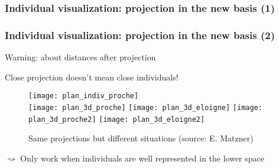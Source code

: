 \begin{frame}[fragile]
  \frametitle{Individual visualization: projection in the new basis (1)}

\begin{knitrout}
\color{fgcolor}\begin{kframe}
\begin{alltt}
  \hlstd{=} \hlopt{$}\hlopt{$}  
\end{alltt}


{\ttfamily\noindent\bfseries{}}\end{kframe}
\end{knitrout}

\end{frame}

\begin{frame}[fragile]
  \frametitle{Individual visualization: projection in the new basis (2)}

\begin{knitrout}
\color{fgcolor}\begin{kframe}
\begin{alltt}
  \hlstd{=} \hlstd{(}\hlstd{,}\hlstd{),}  \hlstd{=} \hlopt{$}\hlopt{$}  
\end{alltt}


{\ttfamily\noindent\bfseries{}}\end{kframe}
\end{knitrout}

\end{frame}

\begin{frame}{Warning: about distances after projection}

  \alert{Close projection doesn't mean close individuals!}

  \begin{figure}
    \texttt{[image: plan\_indiv\_proche]}\\[1ex]
    \texttt{[image: plan\_3d\_proche]}
    \texttt{[image: plan\_3d\_eloigne]}
    \texttt{[image: plan\_3d\_proche2]}
    \texttt{[image: plan\_3d\_eloigne2]}
    \caption{Same projections but different situations {\tiny (source: E. Matzner)}}

  \end{figure}

 $\rightsquigarrow$ Only work when individuals are well represented in the lower space
\end{frame}

